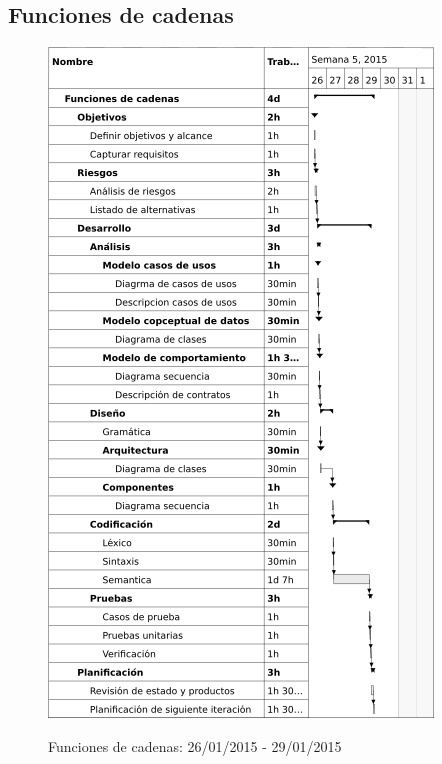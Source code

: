 \subsection{Funciones de cadenas}
\begin{center}
\begin{figure}[H]
\centering
\includegraphics[scale=1]{planning/11-funciones-cadenas.png} \\
\caption{Funciones de cadenas: 26/01/2015 - 29/01/2015 }
\end{figure}
\end{center}

